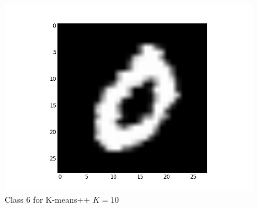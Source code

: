 \documentclass[submit]{harvardml}
\begin{document}
\begin{figure}[ht]
    \includegraphics[scale=0.20]{K10-representative-5-2}
    \caption{Class 6 for K-means++ $K=10$}
\end{figure}
\end{document}
